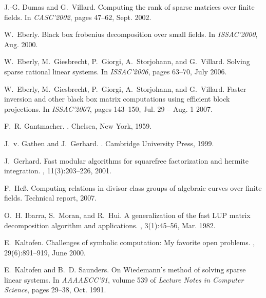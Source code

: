 \documentclass{article}
\begin{document}
{\begin{thebibliography}{10}
J.-G. Dumas and G.~Villard.
\newblock Computing the rank of sparse matrices over finite fields.
\newblock In {\em {CASC}'2002}, pages 47--62, Sept. 2002.

W.~Eberly.
\newblock Black box frobenius decomposition over small fields.
\newblock In {\em {ISSAC}'2000}, Aug. 2000.

W.~Eberly, M.~Giesbrecht, P.~Giorgi, A.~Storjohann, and G.~Villard.
\newblock Solving sparse rational linear systems.
\newblock In {\em {ISSAC}'2006}, pages 63--70, July 2006.

W.~Eberly, M.~Giesbrecht, P.~Giorgi, A.~Storjohann, and G.~Villard.
\newblock Faster inversion and other black box matrix computations using
  efficient block projections.
\newblock In {\em {ISSAC}'2007}, pages 143--150, Jul. 29 -- Aug. 1 2007.

F.~R. Gantmacher.
.
\newblock Chelsea, New York, 1959.

J.~v. Gathen and J.~Gerhard.
.
\newblock Cambridge University Press, 1999.

J.~Gerhard.
\newblock Fast modular algorithms for squarefree factorization and hermite
  integration.
,
  11(3):203--226, 2001.

F.~He{\ss}. 
\newblock Computing relations in divisor class groups of algebraic
curves over finite fields.
\newblock Technical report, 2007.

O.~H. Ibarra, S.~Moran, and R.~Hui.
\newblock A generalization of the fast {LUP} matrix decomposition algorithm and
  applications.
, 3(1):45--56, Mar. 1982.

E.~Kaltofen.
\newblock Challenges of symbolic computation: My favorite open problems.
, 29(6):891--919, June 2000.

E.~Kaltofen and B.~D. Saunders.
\newblock On {Wiedemann's} method of solving sparse linear systems.
\newblock In {\em AAAAECC'91}, volume 539 of {\em Lecture Notes in Computer
  Science}, pages 29--38, Oct. 1991.


\end{thebibliography}}
\end{document}
